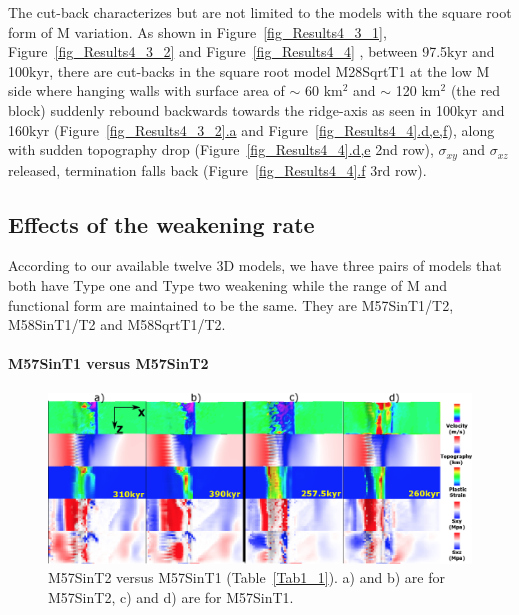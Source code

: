 The cut-back characterizes but are not limited to the models with the square root form of M variation. As shown in Figure~\hyperref[fig_Results4_3_1]{\ref{fig_Results4_3_1}}, Figure~\hyperref[fig_Results4_3_1]{\ref{fig_Results4_3_2}} and Figure~\hyperref[fig_Results4_4]{\ref{fig_Results4_4}} , between 97.5kyr and 100kyr, there are cut-backs in the square root model M28SqrtT1 at the low M side where hanging walls with surface area of $\sim$ 60 km$^{2}$ and $\sim$ 120 km$^{2}$ (the red block) suddenly rebound backwards towards the ridge-axis as seen in 100kyr and 160kyr (Figure~\hyperref[fig_Results4_3_1]{\ref{fig_Results4_3_2}.a} and Figure~\hyperref[fig_Results4_4]{\ref{fig_Results4_4}.d,e,f}), along with sudden topography drop (Figure~\hyperref[fig_Results4_4]{\ref{fig_Results4_4}.d,e} 2nd row), $\sigma_{xy}$ and $\sigma_{xz}$ released, termination falls back (Figure~\hyperref[fig_Results4_4]{\ref{fig_Results4_4}.f} 3rd row). 

\subsection{Effects of the weakening rate}

According to our available twelve 3D models, we have three pairs of models that both have Type one and Type two  weakening while the range of M and functional form are maintained to be the same. They are M57SinT1/T2, M58SinT1/T2 and M58SqrtT1/T2.

\paragraph{M57SinT1 versus M57SinT2}

\begin{figure}[h]
 \centering
  \includegraphics[width=1.0\textwidth]{./Figures/fig_Results_Weakening_2_M57SinT1VST2_CutbackVSsecondaryFault.eps}
 \caption{M57SinT2 versus M57SinT1 (Table~\hyperref[Tab1_1]{\ref{Tab1_1}}). a) and b) are for M57SinT2, c) and d) are for M57SinT1.}
\label{fig_Results_Weakenging_2}
\end{figure}

